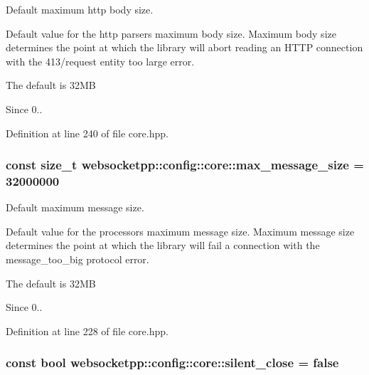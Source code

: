 Default maximum http body size. 

Default value for the http parser\textquotesingle{}s maximum body size. Maximum body size determines the point at which the library will abort reading an H\+T\+TP connection with the 413/request entity too large error.

The default is 32\+MB

\begin{DoxySince}{Since}
0.. 
\end{DoxySince}


Definition at line 240 of file core.\+hpp.

\subsubsection[{\texorpdfstring{max\+\_\+message\+\_\+size}{max\_message\_size}}]{\setlength{\rightskip}{0pt plus 5cm}const size\+\_\+t websocketpp\+::config\+::core\+::max\+\_\+message\+\_\+size = 32000000\hspace{0.3cm}{\ttfamily [static]}}\hypertarget{structwebsocketpp_1_1config_1_1core_a54875ed41a1d11149c684f9467b2e0d5}{}\label{structwebsocketpp_1_1config_1_1core_a54875ed41a1d11149c684f9467b2e0d5}


Default maximum message size. 

Default value for the processor\textquotesingle{}s maximum message size. Maximum message size determines the point at which the library will fail a connection with the message\+\_\+too\+\_\+big protocol error.

The default is 32\+MB

\begin{DoxySince}{Since}
0.. 
\end{DoxySince}


Definition at line 228 of file core.\+hpp.

\subsubsection[{\texorpdfstring{silent\+\_\+close}{silent\_close}}]{\setlength{\rightskip}{0pt plus 5cm}const bool websocketpp\+::config\+::core\+::silent\+\_\+close = false\hspace{0.3cm}{\ttfamily [static]}}\hypertarget{structwebsocketpp_1_1config_1_1core_acb5ef1d40ae50ab2443837270d715f53}{}\label{structwebsocketpp_1_1config_1_1core_acb5ef1d40ae50ab2443837270d715f53}


